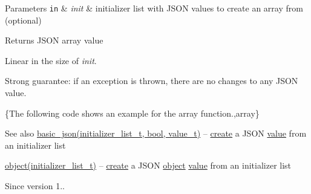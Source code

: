 \begin{DoxyParams}[1]{Parameters}
\mbox{\tt in}  & {\em init} & initializer list with J\+S\+ON values to create an array from (optional)\\
\hline
\end{DoxyParams}
\begin{DoxyReturn}{Returns}
J\+S\+ON array value
\end{DoxyReturn}
Linear in the size of {\itshape init}.

Strong guarantee\+: if an exception is thrown, there are no changes to any J\+S\+ON value.

\{The following code shows an example for the {\ttfamily array} function.,array\}

\begin{DoxySeeAlso}{See also}
\hyperlink{classnlohmann_1_1basic__json_aeac617faf3448d6d2cb33a020be01d37}{basic\+\_\+json(initializer\+\_\+list\+\_\+t, bool, value\+\_\+t)} -- \hyperlink{classnlohmann_1_1basic__json_a49cba7a0d3a355161e2b62b437b80936}{create} a J\+S\+ON \hyperlink{classnlohmann_1_1basic__json_ac9e014095170d72c4c57e3daf8efc059}{value} from an initializer list 

\hyperlink{classnlohmann_1_1basic__json_a9a4df356e05415438fadf8a15e583903}{object(initializer\+\_\+list\+\_\+t)} -- \hyperlink{classnlohmann_1_1basic__json_a49cba7a0d3a355161e2b62b437b80936}{create} a J\+S\+ON \hyperlink{classnlohmann_1_1basic__json_a9a4df356e05415438fadf8a15e583903}{object} \hyperlink{classnlohmann_1_1basic__json_ac9e014095170d72c4c57e3daf8efc059}{value} from an initializer list
\end{DoxySeeAlso}
\begin{DoxySince}{Since}
version 1.. 
\end{DoxySince}
